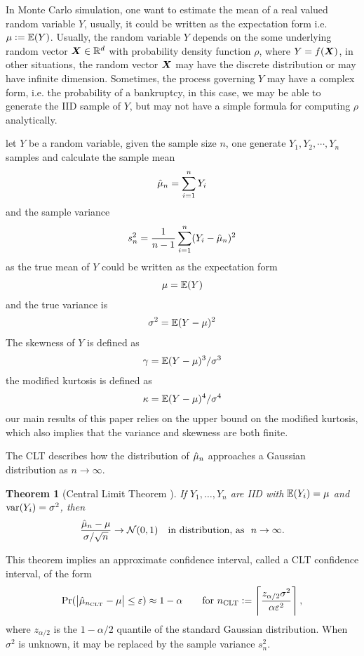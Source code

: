 \documentclass{iitthesis}
\newtheorem{theorem}{Theorem}[section]
\begin{document}
\label{basicInequalities}

In Monte Carlo simulation, one want to estimate the mean of a real valued random variable $Y$, usually, it could be written as the expectation form i.e. $\mu:=\mathbb{E}(Y)$. Usually, the random variable $Y$ depends on the some underlying random vector $\boldsymbol{X} \in \mathbb{R}^d$ with probability density function $\rho$, where $Y = f(\boldsymbol{X})$, in other situations, the random vector $\boldsymbol{X}$ may have the discrete distribution or may have infinite dimension. Sometimes, the process governing
$Y$ may have a complex form,  i.e. the probability of a bankruptcy, in this case, we may be able to generate the IID sample of $Y$, but may not have a simple formula for computing $\rho$ analytically. 

let $Y$ be a random variable, given the sample size $n$, one generate $Y_1, Y_2, \cdots, Y_n$ samples and calculate the sample mean 
\begin{align}\label{samplemean}
\hat{\mu}_n = \sum_{i=1}^n Y_i
\end{align}
and the sample variance
\begin{align}\label{samplevar}
s^2_n = \frac{1}{n-1}\sum_{i=1}^n (Y_i-\hat{\mu}_n)^2
\end{align}
as the true mean of $Y$ could be written as the expectation form
\begin{align}\label{truemean}
\mu = \mathbb{E}(Y)
\end{align}
and the true variance is
\begin{align}\label{truevar}
\sigma^2 = \mathbb{E}(Y-\mu)^2
\end{align}
The skewness of $Y$ is defined as 
\begin{align}\label{screwness}
\gamma = \mathbb{E}(Y-\mu)^3/\sigma^3
\end{align}
the modified kurtosis is defined as
\begin{align}\label{kurtosis}
\kappa = \mathbb{E}(Y-\mu)^4/\sigma^4
\end{align}
our main results of this paper relies on the upper bound on the modified kurtosis, which also implies that the variance and skewness are both finite.

The CLT describes how the distribution of $\hat{\mu}_n$ approaches a Gaussian distribution as $n \to \infty$.
\begin{theorem}[Central Limit Theorem {\cite[Theorem 21.1]{JP04}}] \label{clt} 
If $Y_1, \ldots, Y_n$ are IID with $\mathbb{E}(Y_i)=\mu$ and $\operatorname{var}(Y_i) = \sigma^2$, then
$$
\frac{\hmu_n-\mu}{\sigma/\sqrt{n}} \to \dnorm(0,1) \quad \text{in distribution, as} \ \ n\to\infty.
$$
\end{theorem}
This theorem implies an approximate confidence interval, called a CLT confidence interval, of the form
\[
\Pr(\left \lvert \hat{\mu}_{n_{\text{CLT}}}-\mu \right \rvert \le \varepsilon) \approx 1- \alpha \qquad \text{for } n_{\text{CLT}} := \left \lceil \frac{z_{\alpha/2}\sigma^2}{\alpha \varepsilon^2} \right \rceil,
\]
where $z_{\alpha/2}$ is the $1-\alpha/2$ quantile of the standard Gaussian distribution.  When $\sigma^2$ is unknown, it may be replaced by the sample variance $s_n^2$.
\end{document}
